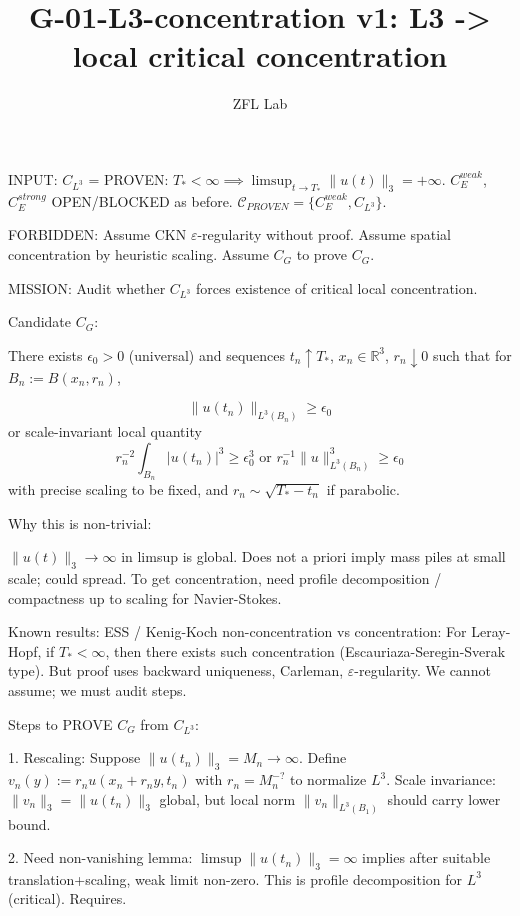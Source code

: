 \documentclass[11pt]{article}
\title{G-01-L3-concentration v1: L3 -> local critical concentration}
\author{ZFL Lab}
\begin{document}
\maketitle

INPUT:
$C_{L^3}$ = PROVEN: $T_*<\infty\implies \limsup_{t\to T_*}\|u(t)\|_3=+\infty$.
$C_E^{weak}$, $C_E^{strong}$ OPEN/BLOCKED as before.
$\mathcal{C}_{PROVEN}=\{C_E^{weak},C_{L^3}\}$.

FORBIDDEN:
Assume CKN $\varepsilon$-regularity without proof.
Assume spatial concentration by heuristic scaling.
Assume $C_G$ to prove $C_G$.

MISSION: Audit whether $C_{L^3}$ forces existence of critical local concentration.

Candidate $C_G$:

There exists $\epsilon_0>0$ (universal) and sequences
$t_n\uparrow T_*$, $x_n\in\mathbb R^3$, $r_n\downarrow 0$ such that for
$B_n:=B(x_n,r_n)$,

\begin{equation*}
\boxed{\|u(t_n)\|_{L^3(B_n)} \ge \epsilon_0}
\end{equation*}
or scale-invariant local quantity
\begin{equation*}
\boxed{r_n^{-2}\int_{B_n}|u(t_n)|^3 \ge \epsilon_0^3 \text{ or } r_n^{-1}\|u\|_{L^3(B_n)}^3 \ge \epsilon_0}
\end{equation*}
with precise scaling to be fixed, and $r_n\sim \sqrt{T_*-t_n}$ if parabolic.

Why this is non-trivial:

$\|u(t)\|_3\to\infty$ in limsup is global. Does not a priori imply mass piles at small scale; could spread. To get concentration, need profile decomposition / compactness up to scaling for Navier-Stokes.

Known results: ESS / Kenig-Koch non-concentration vs concentration: For Leray-Hopf, if $T_*<\infty$, then there exists such concentration (Escauriaza-Seregin-Sverak type). But proof uses backward uniqueness, Carleman, $\varepsilon$-regularity. We cannot assume; we must audit steps.

Steps to PROVE $C_G$ from $C_{L^3}$:

1. Rescaling: Suppose $\|u(t_n)\|_3 = M_n\to\infty$. Define $v_n(y):= r_n u(x_n+r_n y, t_n)$ with $r_n = M_n^{-?}$ to normalize $L^3$.
Scale invariance: $\|v_n\|_3 = \|u(t_n)\|_3$ global, but local norm $\|v_n\|_{L^3(B_1)}$ should carry lower bound.

2. Need non-vanishing lemma: $\limsup\|u(t_n)\|_3=\infty$ implies after suitable translation+scaling, weak limit non-zero. This is profile decomposition for $L^3$ (critical). Requires.
\end{document}
